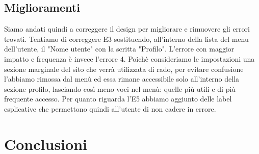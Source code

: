 \documentclass[../Report.tex]{subfiles}
\begin{document}
    \section{Miglioramenti}
    Siamo andati quindi a correggere il design per migliorare e rimuovere gli errori trovati. Tentiamo di correggere E3 sostituendo, all'interno della lista del menu dell'utente, il "Nome utente" con la scritta "Profilo". L'errore con maggior impatto e frequenza è invece l'errore 4. Poichè consideriamo le impostazioni una sezione marginale del sito che verrà utilizzata di rado, per evitare confusione l'abbiamo rimossa dal menù ed essa rimane accessibile solo all'interno della sezione profilo, lasciando così meno voci nel menù: quelle più utili e di più frequente accesso. Per quanto riguarda l'E5 abbiamo aggiunto delle label esplicative che permettono quindi all'utente di non cadere in errore. 
    \chapter{Conclusioni}
\end{document}
